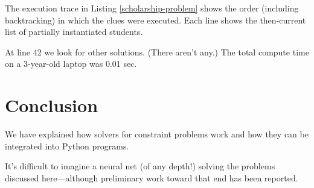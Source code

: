 The execution trace in Listing \ref{scholarship-problem} shows the order (including backtracking) in which the clues were executed. Each line shows the then-current list of partially instantiated students. 

At line 42 we look for other solutions. (There aren't any.) The total compute time on a 3-year-old laptop was 0.01 sec. 

\section{Conclusion} \label{sec:conclusion}

We have explained how solvers for constraint problems work and how they can be integrated into Python programs. 

It's difficult to imagine a neural net (of any depth!) solving the problems discussed here---although preliminary work toward that end has been reported. \cite{xu2018towards, amel2019shallow, dubois2019towards}




